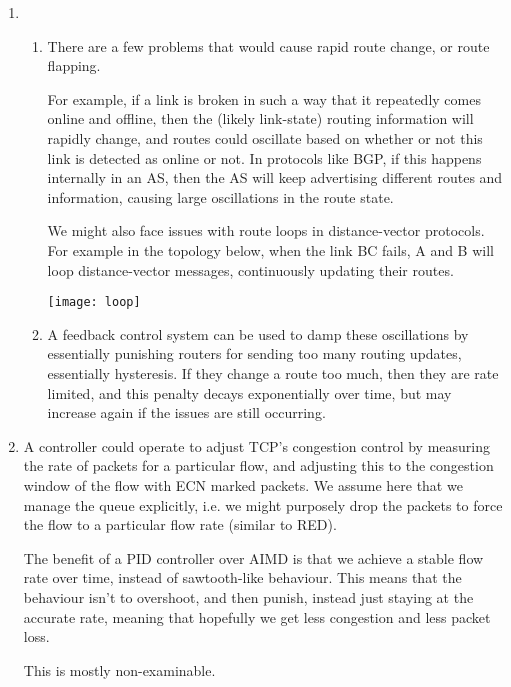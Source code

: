 


\begin{enumerate}[label=(\alph*)]
  \item
    \begin{enumerate}[label=(\roman*)]
      \item
        There are a few problems that would cause rapid route change, or route flapping.

        For example, if a link is broken in such a way that it repeatedly comes online and offline, then the (likely link-state) routing information will rapidly change, and routes could oscillate based on whether or not this link is detected as online or not. In protocols like BGP, if this happens internally in an AS, then the AS will keep advertising different routes and information, causing large oscillations in the route state.

        We might also face issues with route loops in distance-vector protocols. For example in the topology below, when the link BC fails, A and B will loop distance-vector messages, continuously updating their routes.

        \texttt{[image: loop]}

      \item
        A feedback control system can be used to damp these oscillations by essentially punishing routers for sending too many routing updates, essentially hysteresis. If they change a route too much, then they are rate limited, and this penalty decays exponentially over time, but may increase again if the issues are still occurring.
        
    \end{enumerate}

  \item
    A controller could operate to adjust TCP's congestion control by measuring the rate of packets for a particular flow, and adjusting this to the congestion window of the flow with ECN marked packets. We assume here that we manage the queue explicitly, i.e. we might purposely drop the packets to force the flow to a particular flow rate (similar to RED).

    The benefit of a PID controller over AIMD is that we achieve a stable flow rate over time, instead of sawtooth-like behaviour. This means that the behaviour isn't to overshoot, and then punish, instead just staying at the accurate rate, meaning that hopefully we get less congestion and less packet loss.

    This is mostly non-examinable.



        
\end{enumerate}

